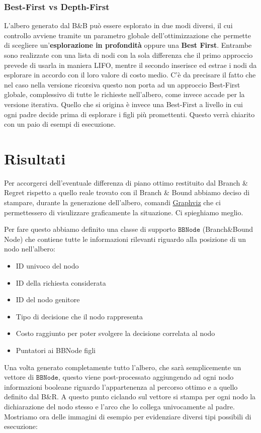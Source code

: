 \documentclass[
    article,            %
    12pt,                %
    oneside,            %
    a4paper,            %
    english,            %
    italian,                %
    sumario=tradicional,
]{abntex2}
\begin{document}
\subsubsection{Best-First vs Depth-First}
L'albero generato dal B\&B può essere esplorato in due modi diversi, il cui controllo avviene tramite un parametro globale dell'ottimizzazione che permette di scegliere un'\textbf{esplorazione in profondità} oppure una \textbf{Best First}. Entrambe sono realizzate con una lista di nodi con la sola differenza che il primo approccio prevede di usarla in maniera LIFO, mentre il secondo inserisce ed estrae i nodi da esplorare in accordo con il loro valore di costo medio. C'è da precisare il fatto che nel caso nella versione ricorsiva questo non porta ad un approccio Best-First globale, complessivo di tutte le richieste nell'albero, come invece accade per la versione iterativa. Quello che si origina è invece una Best-First a livello in cui ogni padre decide prima di esplorare i figli più promettenti. Questo verrà chiarito con un paio di esempi di esecuzione.

\section{Risultati}
Per accorgerci dell'eventuale differenza di piano ottimo restituito dal Branch \& Regret rispetto a quello reale trovato con il Branch \& Bound abbiamo deciso di stampare, durante la generazione dell'albero, comandi \href{https://graphviz.org/}{Graphviz} che ci permettessero di visulizzare graficamente la situazione. Ci spieghiamo meglio. 

Per fare questo abbiamo definito una classe di supporto $\texttt{BBNode}$ (Branch\&Bound Node) che contiene tutte le informazioni rilevanti riguardo alla posizione di un nodo nell'albero: 
\begin{itemize}
    \item ID univoco del nodo
    \item ID della richiesta considerata
    \item ID del nodo genitore
    \item Tipo di decisione che il nodo rappresenta
    \item Costo raggiunto per poter svolgere la decisione correlata al nodo
    \item Puntatori ai BBNode figli
\end{itemize}
Una volta generato completamente tutto l'albero, che sarà semplicemente un vettore di $\texttt{BBNode}$, questo viene post-processato aggiungendo ad ogni nodo informazioni booleane riguardo l'appartenenza al percorso ottimo e a quello definito dal B\&R. \newline A questo punto ciclando sul vettore si stampa per ogni nodo la dichiarazione del nodo stesso e l'arco che lo collega univocamente al padre. Mostriamo ora delle immagini di esempio per evidenziare diversi tipi possibili di esecuzione:
\end{document}
